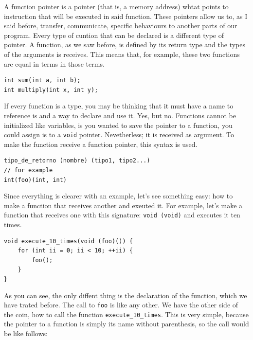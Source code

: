 \documentclass[a4paper]{article}
\begin{document}
A function pointer is a pointer (that is, a memory address) whtat points to
instruction that will be executed in said function. These pointers allow us to,
as I said before, transfer, communicate, specific behaviours to another parts of
our program. Every type of cuntion that can be declared is a different type of
pointer. A function, as we saw before, is defined by its return type and the
types of the arguments is receives. This means that, for example, these two
functions are equal in terms in those terms.

\noindent
\begin{minipage}[H]{\linewidth}
\begin{lstlisting}[style=C]
int sum(int a, int b);
int multiply(int x, int y);
\end{lstlisting}
\end{minipage}

If every function is a type, you may be thinking that it must have a name to
reference is and a way to declare and use it. Yes, but no. Functions cannot
be initialized like variables, is you wanted to save the pointer to a function,
you could assign is to a \verb!void! pointer. Nevetherless; it is received
as argument. To make the function receive a function pointer, this syntax is
used.

\noindent
\begin{minipage}[H]{\linewidth}
\begin{lstlisting}[style=C]
tipo_de_retorno (nombre) (tipo1, tipo2...)
// for example
int(foo)(int, int)
\end{lstlisting}
\end{minipage}

Since everything is clearer with an example, let's see something easy: how to
make a function that receives another and exeuted it. For example, let's make
a function that receives one with this signature:
\lstinline[style=C]!void (void)! and executes it ten times.

\noindent
\begin{minipage}[H]{\linewidth}
\begin{lstlisting}[style=C, label={lst:argumentFoo},
caption={Ejemplo primero de puntero a función como argumento}]
void execute_10_times(void (foo)()) {
    for (int ii = 0; ii < 10; ++ii) {
        foo();
    }
}
\end{lstlisting}
\end{minipage}

As you can see, the only diffent thing is the declaration of the function, which
we have trated before. The call to \verb!foo! is like any other. We have the
other side of the coin, how to call the function \verb!execute_10_times!. This
is very simple, because the pointer to a function is simply its name without
parenthesis, so the call would be like follows:
\end{document}
